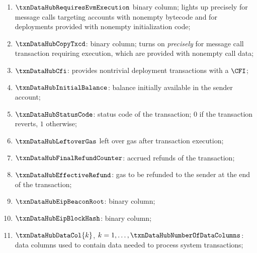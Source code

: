 \begin{enumerate}
	\item
		\markAsPartiallyJustifiedHere{}
		$\txnDataHubRequiresEvmExecution$
		binary column;
		lights up precisely for message calls targeting accounts with nonempty bytecode
		and for deployments provided with nonempty initialization code;
	\item
		\markAsJustifiedHere{}
		$\txnDataHubCopyTxcd$:
		binary column;
		turns on \emph{precisely}
		for message call transaction
		requiring \evm{} execution,
		which are provided with nonempty call data;
	\item
		\markAsExtractedFromHub{}
		$\txnDataHubCfi$:
		provides nontrivial deployment transactions with a $\CFI$;
	\item
		\markAsExtractedFromHub{}
		$\txnDataHubInitialBalance$:
		balance initially available in the sender account;
	\item
		\markAsExtractedFromHub{}
		$\txnDataHubStatusCode$:
		status code of the transaction;
		$0$ if the transaction reverts,
		$1$ otherwise;
	\item
		\markAsExtractedFromHub{}
		$\txnDataHubLeftoverGas$
		left over gas after transaction execution;
	\item
		\markAsExtractedFromHub{}
		$\txnDataHubFinalRefundCounter$:
		accrued refunds of the transaction;
	\item
		\markAsJustifiedHere{}
		$\txnDataHubEffectiveRefund$:
		gas to be refunded to the sender at the end of the transaction;
	\item
		\markAsExtractedFromHub{}
		$\txnDataHubEipBeaconRoot$:
		binary column;
	\item
		\markAsExtractedFromHub{}
		$\txnDataHubEipBlockHash$:
		binary column;
	\item
		\markAsExtractedFromHub{}
		$\txnDataHubDataCol{k}$,
		$k = 1, \dots, \txnDataHubNumberOfDataColumns$:
		data columns used to contain data needed to process system transactions;
\end{enumerate}

